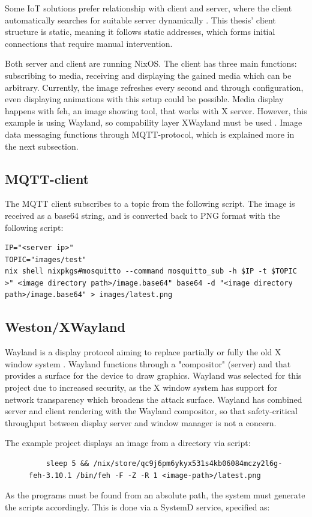 Some IoT solutions prefer relationship with client and
server, where the client automatically searches for suitable server
dynamically \cite{kandoi2021operating}. This thesis' client structure
is static, meaning it follows static addresses, which forms initial
connections that require manual intervention.

Both server and client are running NixOS. The client has three main
functions: subscribing to media, receiving and displaying the gained
media which can be arbitrary. Currently, the image refreshes every
second and through configuration, even displaying animations with this
setup could be possible. Media display happens with feh, an image
showing tool, that works with X server. However, this example is using
Wayland, so compability layer XWayland must be used
\cite{waylandWayland}. Image data messaging functions through
MQTT-protocol, which is explained more in the next subsection.

\subsection{MQTT-client}
The MQTT client subscribes to a topic from the following script. The
image is received as a base64 string, and is converted back to PNG
format with the following script:
\begin{lstlisting}
IP="<server ip>"
TOPIC="images/test"
nix shell nixpkgs#mosquitto --command mosquitto_sub -h $IP -t $TOPIC >" <image directory path>/image.base64" base64 -d "<image directory path>/image.base64" > images/latest.png
\end{lstlisting}
\subsection{Weston/XWayland}
Wayland is a display protocol aiming to replace partially or fully the
old X window system \cite{waylandWayland}. Wayland functions through a "compositor"
(server) and that provides a surface for the device to draw
graphics. Wayland was selected for this project due to increased
security, as the X window system has support for network transparency
which broadens the attack surface. Wayland has combined server and
client rendering with the Wayland compositor, so that safety-critical
throughput between display server and window manager is not a
concern. 

The example project displays an image from a directory via script:
\begin{figure}[H]
\begin{lstlisting} 
    sleep 5 && /nix/store/qc9j6pm6ykyx531s4kb06084mczy2l6g-feh-3.10.1 /bin/feh -F -Z -R 1 <image-path>/latest.png
\end{lstlisting}
\label{fehscript}
\end{figure}
As the programs must be found from an absolute path, the system must
generate the scripts accordingly. This is done via a SystemD service,
specified as:

